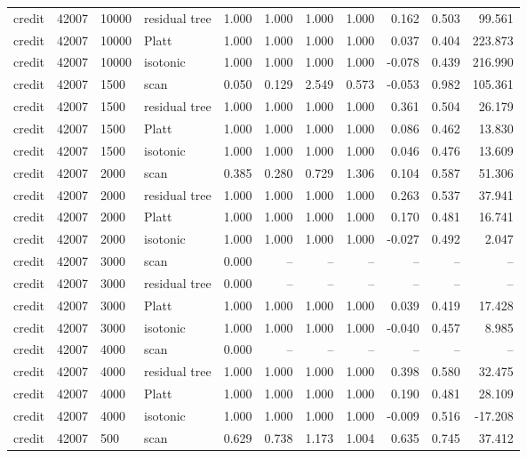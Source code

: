 \begin{tabular}{lrllrrrrrrr}
credit & 42007 & 10000 & residual tree & 1.000 & 1.000 & 1.000 & 1.000 & 0.162 & 0.503 & 99.561 \\
credit & 42007 & 10000 & Platt & 1.000 & 1.000 & 1.000 & 1.000 & 0.037 & 0.404 & 223.873 \\
credit & 42007 & 10000 & isotonic & 1.000 & 1.000 & 1.000 & 1.000 & -0.078 & 0.439 & 216.990 \\
credit & 42007 & 1500 & scan & 0.050 & 0.129 & 2.549 & 0.573 & -0.053 & 0.982 & 105.361 \\
credit & 42007 & 1500 & residual tree & 1.000 & 1.000 & 1.000 & 1.000 & 0.361 & 0.504 & 26.179 \\
credit & 42007 & 1500 & Platt & 1.000 & 1.000 & 1.000 & 1.000 & 0.086 & 0.462 & 13.830 \\
credit & 42007 & 1500 & isotonic & 1.000 & 1.000 & 1.000 & 1.000 & 0.046 & 0.476 & 13.609 \\
credit & 42007 & 2000 & scan & 0.385 & 0.280 & 0.729 & 1.306 & 0.104 & 0.587 & 51.306 \\
credit & 42007 & 2000 & residual tree & 1.000 & 1.000 & 1.000 & 1.000 & 0.263 & 0.537 & 37.941 \\
credit & 42007 & 2000 & Platt & 1.000 & 1.000 & 1.000 & 1.000 & 0.170 & 0.481 & 16.741 \\
credit & 42007 & 2000 & isotonic & 1.000 & 1.000 & 1.000 & 1.000 & -0.027 & 0.492 & 2.047 \\
credit & 42007 & 3000 & scan & 0.000 & -- & -- & -- & -- & -- & -- \\
credit & 42007 & 3000 & residual tree & 0.000 & -- & -- & -- & -- & -- & -- \\
credit & 42007 & 3000 & Platt & 1.000 & 1.000 & 1.000 & 1.000 & 0.039 & 0.419 & 17.428 \\
credit & 42007 & 3000 & isotonic & 1.000 & 1.000 & 1.000 & 1.000 & -0.040 & 0.457 & 8.985 \\
credit & 42007 & 4000 & scan & 0.000 & -- & -- & -- & -- & -- & -- \\
credit & 42007 & 4000 & residual tree & 1.000 & 1.000 & 1.000 & 1.000 & 0.398 & 0.580 & 32.475 \\
credit & 42007 & 4000 & Platt & 1.000 & 1.000 & 1.000 & 1.000 & 0.190 & 0.481 & 28.109 \\
credit & 42007 & 4000 & isotonic & 1.000 & 1.000 & 1.000 & 1.000 & -0.009 & 0.516 & -17.208 \\
credit & 42007 & 500 & scan & 0.629 & 0.738 & 1.173 & 1.004 & 0.635 & 0.745 & 37.412 \\

\end{tabular}
